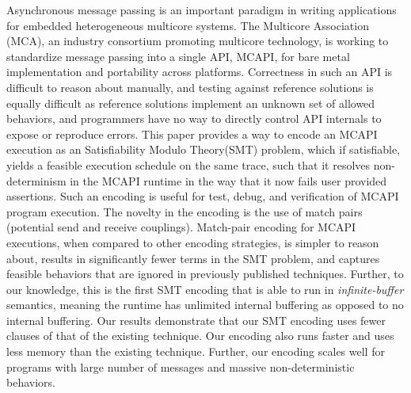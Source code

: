 Asynchronous message passing is an important paradigm in writing
applications for embedded heterogeneous multicore systems.  The
Multicore Association (MCA), an industry consortium promoting
multicore technology, is working to standardize message passing into a
single API, MCAPI, for bare metal implementation and portability
across platforms.  Correctness in such an API is difficult to reason
about manually, and testing against reference solutions is equally
difficult as reference solutions implement an unknown set of allowed
behaviors, and programmers have no way to directly control API
internals to expose or reproduce errors.  This paper provides a way to encode an MCAPI
execution as an Satisfiability Modulo Theory(SMT) problem, which if satisfiable, yields a feasible
execution schedule on the same trace,
such that it resolves non-determinism in the MCAPI runtime in the way that it now fails user provided assertions.
Such an encoding is useful for test, debug, and
verification of MCAPI program execution.  The novelty in the encoding
is the use of match pairs (potential send and receive couplings).  Match-pair encoding for
MCAPI executions, when compared to other encoding strategies, is
simpler to reason about, results in significantly fewer terms in the
SMT problem, and captures feasible behaviors that are ignored in
previously published techniques. Further, to our knowledge, this is the first SMT encoding  that is able to run in \textit{infinite-buffer} semantics, meaning the runtime has unlimited internal buffering as opposed to no internal buffering. %
Our results demonstrate that our SMT encoding uses fewer clauses of that of the existing technique. Our encoding also runs faster and uses less memory than the existing technique. Further, our encoding scales well for programs with large number of messages and massive non-deterministic behaviors. 